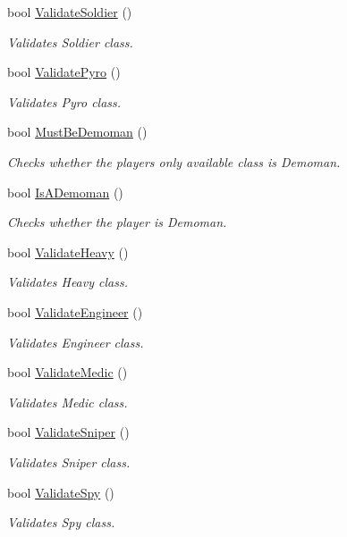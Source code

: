 \begin{DoxyCompactItemize}
bool \hyperlink{class_player_ab5a960410e5c468e83bf651e0eceefeb}{Validate\+Soldier} ()
\begin{DoxyCompactList}\small\item\em Validates Soldier class. \end{DoxyCompactList}\item 
bool \hyperlink{class_player_ae9efa548a673a85c647bb2f277758ac8}{Validate\+Pyro} ()
\begin{DoxyCompactList}\small\item\em Validates Pyro class. \end{DoxyCompactList}\item 
bool \hyperlink{class_player_abed3b8f57e4c0c1195ee31eb39773b5f}{Must\+Be\+Demoman} ()
\begin{DoxyCompactList}\small\item\em Checks whether the player\textquotesingle{}s only available class is Demoman. \end{DoxyCompactList}\item 
bool \hyperlink{class_player_ab440f9658e90851537ecab9689014421}{Is\+A\+Demoman} ()
\begin{DoxyCompactList}\small\item\em Checks whether the player is Demoman. \end{DoxyCompactList}\item 
bool \hyperlink{class_player_a3129459280a43146ff7273e25c9c9910}{Validate\+Heavy} ()
\begin{DoxyCompactList}\small\item\em Validates Heavy class. \end{DoxyCompactList}\item 
bool \hyperlink{class_player_ae248a4a84b6219400d56d76cf2893ae3}{Validate\+Engineer} ()
\begin{DoxyCompactList}\small\item\em Validates Engineer class. \end{DoxyCompactList}\item 
bool \hyperlink{class_player_a892bc0aecc4f485cc97fad89680e83cc}{Validate\+Medic} ()
\begin{DoxyCompactList}\small\item\em Validates Medic class. \end{DoxyCompactList}\item 
bool \hyperlink{class_player_ad59223bff91b71bff98ead0a1bd83738}{Validate\+Sniper} ()
\begin{DoxyCompactList}\small\item\em Validates Sniper class. \end{DoxyCompactList}\item 
bool \hyperlink{class_player_a92965548db9cd01fb649a8175ab93a03}{Validate\+Spy} ()
\begin{DoxyCompactList}\small\item\em Validates Spy class. \end{DoxyCompactList}\end{DoxyCompactItemize}
